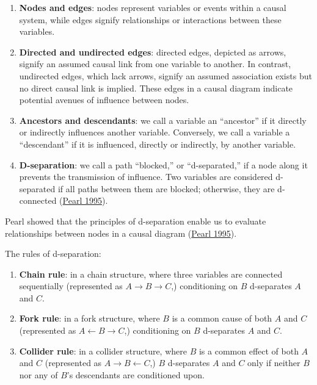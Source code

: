 \documentclass[
  singlecolumn]{article}
\begin{document}
\begin{enumerate}
\def\labelenumi{\arabic{enumi}.}
\item
  \textbf{Nodes and edges}: nodes represent variables or events within a
  causal system, while edges signify relationships or interactions
  between these variables.
\item
  \textbf{Directed and undirected edges}: directed edges, depicted as
  arrows, signify an assumed causal link from one variable to another.
  In contrast, undirected edges, which lack arrows, signify an assumed
  association exists but no direct causal link is implied. These edges
  in a causal diagram indicate potential avenues of influence between
  nodes.
\item
  \textbf{Ancestors and descendants}: we call a variable an ``ancestor''
  if it directly or indirectly influences another variable. Conversely,
  we call a variable a ``descendant'' if it is influenced, directly or
  indirectly, by another variable.
\item
  \textbf{D-separation}: we call a path ``blocked,'' or ``d-separated,''
  if a node along it prevents the transmission of influence. Two
  variables are considered d-separated if all paths between them are
  blocked; otherwise, they are d-connected
  (\protect\hyperlink{ref-pearl1995}{Pearl 1995}).
\end{enumerate}

Pearl showed that the principles of d-separation enable us to evaluate
relationships between nodes in a causal diagram
(\protect\hyperlink{ref-pearl1995}{Pearl 1995}).

The rules of d-separation:

\begin{enumerate}
\def\labelenumi{\alph{enumi}.}
\item
  \textbf{Chain rule}: in a chain structure, where three variables are
  connected sequentially (represented as
  \(A \rightarrow B \rightarrow C\),) conditioning on \(B\) d-separates
  \(A\) and \(C\).
\item
  \textbf{Fork rule}: in a fork structure, where \(B\) is a common cause
  of both \(A\) and \(C\) (represented as
  \(A \leftarrow B \rightarrow C\),) conditioning on \(B\) d-separates
  \(A\) and \(C\).
\item
  \textbf{Collider rule}: in a collider structure, where \(B\) is a
  common effect of both \(A\) and \(C\) (represented as
  \(A \rightarrow B \leftarrow C\),) \(B\) d-separates \(A\) and \(C\)
  only if neither \(B\) nor any of \(B\)'s descendants are conditioned
  upon.
\end{enumerate}
\end{document}
